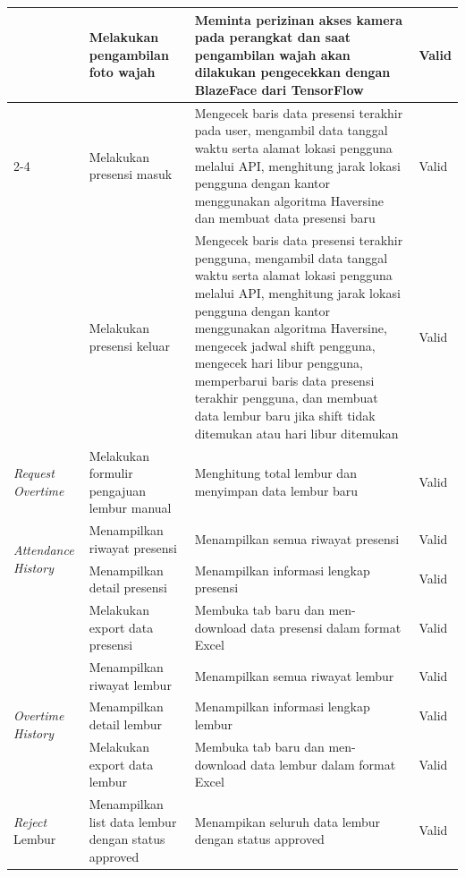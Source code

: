 \begin{longtable}{ |p{3cm}|p{4cm}|p{4cm}|p{2cm}|}
\multirow{2}{*}{}
&Melakukan pengambilan foto wajah
&Meminta perizinan akses kamera pada perangkat dan saat pengambilan wajah akan dilakukan pengecekkan dengan BlazeFace dari TensorFlow
&Valid
\\

\cline{2-4}
&Melakukan presensi masuk
&Mengecek baris data presensi terakhir pada user, mengambil data tanggal waktu serta alamat lokasi pengguna melalui API, menghitung jarak lokasi pengguna dengan kantor menggunakan algoritma Haversine dan membuat data presensi baru
&Valid
\\
\hline

\multirow{1}{*}{}
&Melakukan presensi keluar
&Mengecek baris data presensi terakhir pengguna, mengambil data tanggal waktu serta alamat lokasi pengguna melalui API, menghitung jarak lokasi pengguna dengan kantor menggunakan algoritma Haversine, mengecek jadwal shift pengguna, mengecek hari libur pengguna, memperbarui baris data presensi terakhir pengguna, dan membuat data lembur baru jika shift tidak ditemukan atau hari libur ditemukan
&Valid
\\
\hline


\multirow{1}{*}{\textit{Request Overtime}}
&Melakukan formulir pengajuan lembur manual
&Menghitung total lembur dan menyimpan data lembur baru
&Valid
\\
\hline

\multirow{2}{*}{\textit{Attendance History}}
&Menampilkan riwayat presensi
&Menampilkan semua riwayat presensi
&Valid
\\

\cline{2-4}
&Menampilkan detail presensi
&Menampilkan informasi lengkap presensi
&Valid
\\
\hline

\multirow{1}{*}{}
&Melakukan export data presensi
&Membuka tab baru dan men-download data presensi dalam format Excel
&Valid
\\
\hline

\multirow{3}{*}{\textit{Overtime History}}
&Menampilkan riwayat lembur
&Menampilkan semua riwayat lembur
&Valid
\\

\cline{2-4}
&Menampilkan detail lembur
&Menampilkan informasi lengkap lembur
&Valid
\\

\cline{2-4}
&Melakukan export data lembur
&Membuka tab baru dan men-download data lembur dalam format Excel
&Valid
\\
\hline

\multirow{3}{*}{\textit{Reject} Lembur}
&Menampilkan list data lembur dengan status approved
&Menampikan seluruh data lembur dengan status approved
&Valid
\\


\end{longtable}
